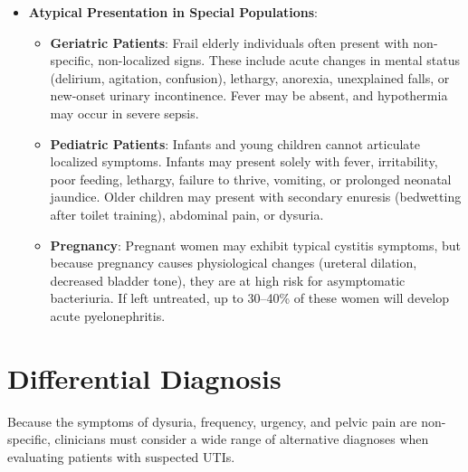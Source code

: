 \begin{itemize}
\begin{itemize}
        \item \textbf{Associated Lower Urinary Tract Symptoms}: Dysuria, frequency, and urgency may precede or accompany the systemic features of pyelonephritis, though they are absent in a significant minority of cases.
    \end{itemize}
    \item \textbf{Atypical Presentation in Special Populations}:
    \begin{itemize}
        \item \textbf{Geriatric Patients}: Frail elderly individuals often present with non-specific, non-localized signs. These include acute changes in mental status (delirium, agitation, confusion), lethargy, anorexia, unexplained falls, or new-onset urinary incontinence. Fever may be absent, and hypothermia may occur in severe sepsis.
        \item \textbf{Pediatric Patients}: Infants and young children cannot articulate localized symptoms. Infants may present solely with fever, irritability, poor feeding, lethargy, failure to thrive, vomiting, or prolonged neonatal jaundice. Older children may present with secondary enuresis (bedwetting after toilet training), abdominal pain, or dysuria.
        \item \textbf{Pregnancy}: Pregnant women may exhibit typical cystitis symptoms, but because pregnancy causes physiological changes (ureteral dilation, decreased bladder tone), they are at high risk for asymptomatic bacteriuria. If left untreated, up to 30--40\% of these women will develop acute pyelonephritis.
    \end{itemize}
\end{itemize}

\section*{Differential Diagnosis}
Because the symptoms of dysuria, frequency, urgency, and pelvic pain are non-specific, clinicians must consider a wide range of alternative diagnoses when evaluating patients with suspected UTIs.

